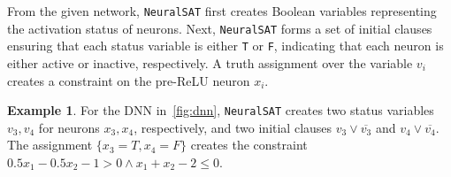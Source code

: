\documentclass[oneside,11pt,dvipsnames]{book}
\numberwithin{equation}{section}
\theoremstyle{definition}
\newtheorem{example}{Example}[section]
\theoremstyle{remark}
\newcommand{\tool}{\texttt{NeuralSAT}}
\begin{document}
From the given network, \tool{} first creates Boolean variables representing the activation status of neurons. Next, \tool{} forms a set of initial clauses ensuring that each status variable is either \texttt{T} or \texttt{F}, indicating that each neuron is either active or inactive, respectively. A truth assignment over the variable $v_i$ creates a constraint on the pre-ReLU neuron $x_i$.


\begin{example}
For the DNN in~\autoref{fig:dnn}, \tool{} creates two status variables $v_3,v_4$ for neurons $x_3,x_4$, respectively, and two initial clauses $v_3\lor \overline{v_3}$ and $v_4 \lor \overline{v_4}$. The assignment $\{x_3=T, x_4=F \}$ creates the constraint $0.5x_1-0.5x_2-1>0 \land x_1 + x_2 -2 \le 0$.
\end{example}






\end{document}
